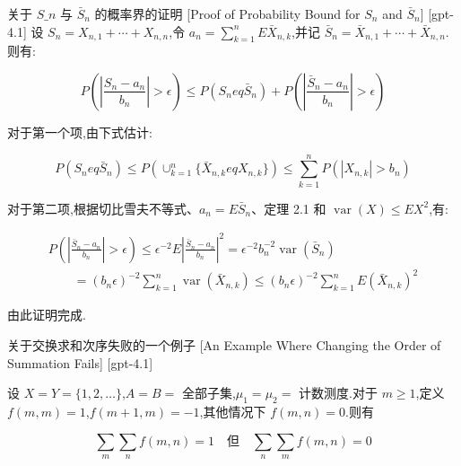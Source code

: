 \documentclass[UTF8]{ctexart}
\begin{document}
    \begin{prf}
        {关于 $S\_n$ 与 $\bar{S}_n$ 的概率界的证明}
        [Proof of Probability Bound for $S_n$ and $\bar{S}_n$]
        [gpt-4.1]
        设 $S_{n} = X_{n, 1} + \cdots + X_{n, n}$,令 $a_{n} = \sum_{k=1}^{n} E \bar{X}_{n, k}$,并记 $\bar{S}_{n} = \bar{X}_{n, 1} + \cdots + \bar{X}_{n, n}$.则有:

\[
P\left(\left| \frac{S_{n} - a_{n}}{b_{n}} \right| > \epsilon \right) \leq P(S_{n} 
eq \bar{S}_{n}) + P\left(\left| \frac{\bar{S}_{n} - a_{n}}{b_{n}} \right| > \epsilon \right)
\]

对于第一个项,由下式估计:

\[
P(S_{n} 
eq \bar{S}_{n}) \leq P\left(\cup_{k=1}^{n} \{ \bar{X}_{n, k} 
eq X_{n, k} \} \right) \leq \sum_{k=1}^{n} P( | X_{n, k} | > b_{n} )
\]

对于第二项,根据切比雪夫不等式、$a_{n} = E \bar{S}_{n}$、定理 2.1 和 $\operatorname{var}(X) \leq E X^{2}$,有:

\[
\begin{array}{l}
{\displaystyle
P\left( \left| \frac{\bar{S}_{n} - a_{n}}{b_{n}} \right| > \epsilon \right)
\leq \epsilon^{-2} E \left| \frac{\bar{S}_{n} - a_{n}}{b_{n}} \right|^{2}
= \epsilon^{-2} b_{n}^{-2} \operatorname{var}(\bar{S}_{n}) } \\
{\displaystyle
\quad\quad = (b_{n}\epsilon)^{-2} \sum_{k=1}^{n} \operatorname{var}(\bar{X}_{n, k})
\leq (b_{n}\epsilon)^{-2} \sum_{k=1}^{n} E (\bar{X}_{n, k})^{2}
}
\end{array}
\]

由此证明完成.

    \end{prf}
    
    
    
    \begin{xmp}
        {关于交换求和次序失败的一个例子}
        [An Example Where Changing the Order of Summation Fails]
        [gpt-4.1]
        
设 $X = Y = \{1, 2, \ldots\}$,$A = B =$ 全部子集,$\mu_{1} = \mu_{2} =$ 计数测度.对于 $m \geq 1$,定义 $f(m, m) = 1$,$f(m + 1, m) = -1$,其他情况下 $f(m, n) = 0$.则有

\[
\sum_{m} \sum_{n} f(m, n) = 1 \quad \text{但} \quad \sum_{n} \sum_{m} f(m, n) = 0
\]

    \end{xmp}
    
\end{document}
